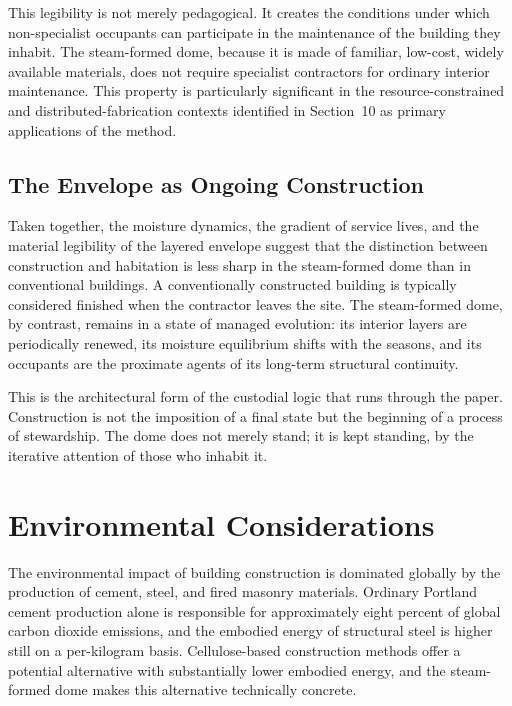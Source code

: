 \documentclass[12pt,a4paper]{article}
\begin{document}
This legibility is not merely pedagogical. It creates the conditions
under which non-specialist occupants can participate in the maintenance
of the building they inhabit. The steam-formed dome, because it is made
of familiar, low-cost, widely available materials, does not require
specialist contractors for ordinary interior maintenance. This property
is particularly significant in the resource-constrained and
distributed-fabrication contexts identified in Section~10 as primary
applications of the method.

\subsection{The Envelope as Ongoing Construction}

Taken together, the moisture dynamics, the gradient of service lives,
and the material legibility of the layered envelope suggest that the
distinction between construction and habitation is less sharp in the
steam-formed dome than in conventional buildings. A conventionally
constructed building is typically considered finished when the
contractor leaves the site. The steam-formed dome, by contrast,
remains in a state of managed evolution: its interior layers are
periodically renewed, its moisture equilibrium shifts with the seasons,
and its occupants are the proximate agents of its long-term structural
continuity.

This is the architectural form of the custodial logic that runs through
the paper. Construction is not the imposition of a final state but the
beginning of a process of stewardship. The dome does not merely stand;
it is kept standing, by the iterative attention of those who inhabit it.

\section{Environmental Considerations}

The environmental impact of building construction is dominated globally
by the production of cement, steel, and fired masonry materials.
Ordinary Portland cement production alone is responsible for
approximately eight percent of global carbon dioxide emissions, and the
embodied energy of structural steel is higher still on a per-kilogram
basis. Cellulose-based construction methods offer a potential
alternative with substantially lower embodied energy, and the
steam-formed dome makes this alternative technically concrete.
\end{document}
